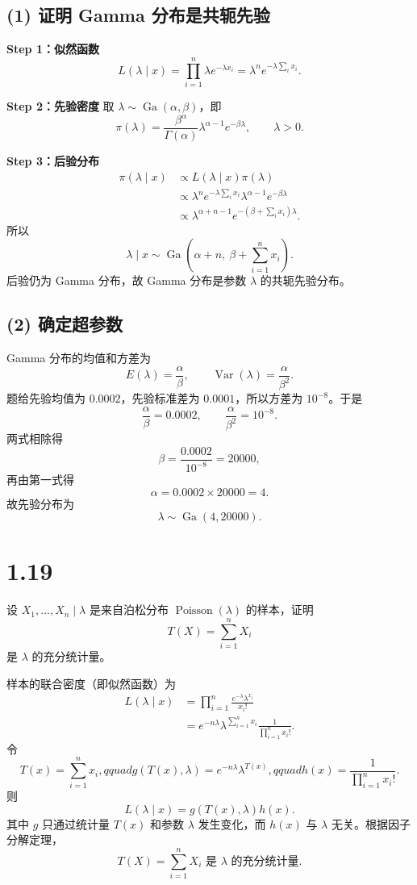 \documentclass[UTF8,zihao=-4]{ctexart}
\begin{document}
\subsection*{(1) 证明 Gamma 分布是共轭先验}
\textbf{Step 1：似然函数}
\[
L(\lambda\mid x)=\prod_{i=1}^n\lambda e^{-\lambda x_i}
=\lambda^n e^{-\lambda\sum_i x_i}.
\]

\textbf{Step 2：先验密度}
取 \(\lambda\sim\operatorname{Ga}(\alpha,\beta)\)，即
\[
\pi(\lambda)=\frac{\beta^\alpha}{\Gamma(\alpha)}
\lambda^{\alpha-1}e^{-\beta\lambda},\qquad\lambda>0.
\]

\textbf{Step 3：后验分布}
\[
\begin{aligned}
\pi(\lambda\mid x)&\propto L(\lambda\mid x)\pi(\lambda)\\
&\propto\lambda^n e^{-\lambda\sum_i x_i}
\lambda^{\alpha-1}e^{-\beta\lambda}\\
&\propto\lambda^{\alpha+n-1}
e^{-\left(\beta+\sum_i x_i\right)\lambda}.
\end{aligned}
\]
所以
\[
\boxed{\lambda\mid x\sim\operatorname{Ga}\left(\alpha+n,\ \beta+\sum_{i=1}^nx_i\right).}
\]
后验仍为 Gamma 分布，故 Gamma 分布是参数 \(\lambda\) 的共轭先验分布。

\subsection*{(2) 确定超参数}
Gamma 分布的均值和方差为
\[
E(\lambda)=\frac\alpha\beta,\qquad
\operatorname{Var}(\lambda)=\frac\alpha{\beta^2}.
\]
题给先验均值为 \(0.0002\)，先验标准差为 \(0.0001\)，所以方差为 \(10^{-8}\)。于是
\[
\frac\alpha\beta=0.0002,\qquad
\frac\alpha{\beta^2}=10^{-8}.
\]
两式相除得
\[
\beta=\frac{0.0002}{10^{-8}}=20000,
\]
再由第一式得
\[
\alpha=0.0002\times20000=4.
\]
故先验分布为
\[
\boxed{\lambda\sim\operatorname{Ga}(4,20000).}
\]

\section*{1.19}
设 \(X_1,\ldots,X_n\mid\lambda\) 是来自泊松分布 \(\operatorname{Poisson}(\lambda)\) 的样本，证明
\[
T(X)=\sum_{i=1}^nX_i
\]
是 \(\lambda\) 的充分统计量。

样本的联合密度（即似然函数）为
\[
\begin{aligned}
L(\lambda\mid x)&=\prod_{i=1}^n\frac{e^{-\lambda}\lambda^{x_i}}{x_i!}\\
&=e^{-n\lambda}\lambda^{\sum_{i=1}^nx_i}
\frac1{\prod_{i=1}^nx_i!}.
\end{aligned}
\]
令
\[
T(x)=\sum_{i=1}^nx_i,qquad
g(T(x),\lambda)=e^{-n\lambda}\lambda^{T(x)},qquad
h(x)=\frac1{\prod_{i=1}^nx_i!}.
\]
则
\[
L(\lambda\mid x)=g(T(x),\lambda)h(x).
\]
其中 \(g\) 只通过统计量 \(T(x)\) 和参数 \(\lambda\) 发生变化，而 \(h(x)\) 与 \(\lambda\) 无关。根据因子分解定理，
\[
\boxed{T(X)=\sum_{i=1}^nX_i\text{ 是 }\lambda\text{ 的充分统计量}.}
\]
\end{document}
